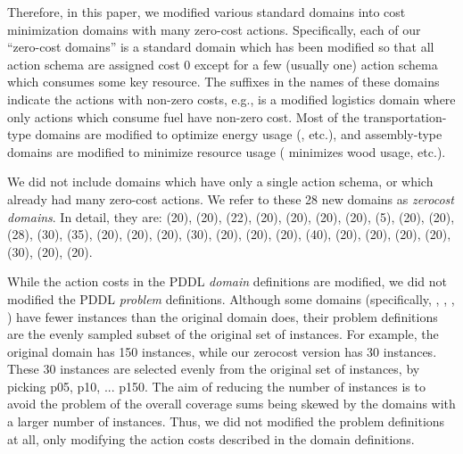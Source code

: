 Therefore, in this paper, we modified various standard domains
into cost minimization domains with many zero-cost actions.
Specifically, each of our ``zero-cost domains'' is a standard domain which has been modified so that all action schema are assigned
cost 0 except for a few (usually one) action schema which consumes some key resource.
The suffixes in the names of these domains indicate the actions with non-zero costs, 
e.g.,  is a modified logistics domain where only actions which consume fuel have non-zero cost.
Most of the transportation-type domains are modified to optimize 
energy usage (,  etc.), and  assembly-type domains are modified to minimize resource usage
( minimizes wood usage, etc.).

We did not
include domains which have only a single action schema, or which already had many zero-cost actions.
We refer to these 28 new domains as \emph{zerocost domains}.
In detail, they are:
 (20),  (20),  (22),  (20),
 (20),  (20),  (20),  (5),
 (20),  (20),  (28),  (30),
 (35),  (20),  (20),
 (20),  (30),  (20),
 (20),  (20),  (40),
 (20),  (20),  (20),
 (20),  (30),  (20),
 (20).

While the action costs in the PDDL \emph{domain} definitions are modified,
we did not modified the PDDL \emph{problem} definitions.
Although some domains (specifically, , , , ) have fewer instances than the original domain does,
their problem definitions are the evenly sampled subset of the original set of instances.
For example, the original  domain has 150 instances, while our zerocost version has 30 instances.
These 30 instances are selected evenly from the original set of instances, by picking p05, p10, ... p150.
% 
The aim of reducing the number of instances is to avoid the problem of the overall coverage sums being skewed by the domains with a larger number of instances.
Thus, we did not modified the problem definitions at all, only modifying the action costs described in the domain definitions.

